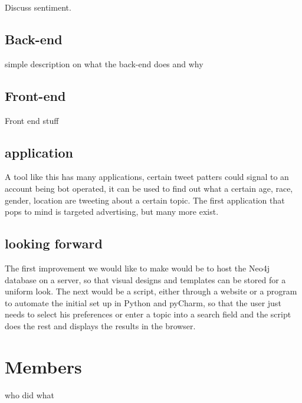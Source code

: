 \documentclass[11pt]{article}
\begin{document}
Discuss sentiment.



\subsection{Back-end}
simple description on what the back-end does and why

\subsection{Front-end}
Front end stuff

\subsection{application}
A tool like this has many applications, certain tweet patters could signal to an account being bot operated, it can be used to find out what a certain age, race, gender, location are tweeting about a certain topic. The first application that pops to mind is targeted advertising, but many more exist.

\subsection{looking forward}
The first improvement we would like to make would be to host the Neo4j database on a server, so that visual designs and templates can be stored for a uniform look. The next would be a script, either through a website or a program to automate the initial set up in Python and pyCharm, so that the user just needs to select his preferences or enter a topic into a search field and the script does the rest and displays the results in the browser.

\section{Members}
who did what
\end{document}
